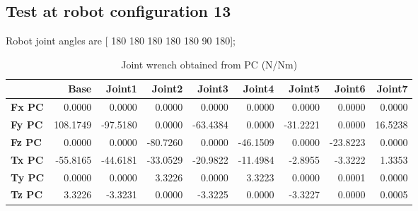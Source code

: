 
\subsection{Test at robot configuration 13}
Robot joint angles are  [ 180  180  180  180  180   90  180];

\begin{table}[h!]
	\centering
	\caption{Joint wrench obtained from PC (N/Nm)}
	\label{wrech_PC_Pose13}
	\begin{tabular}{|l|r|r|r|r|r|r|r|r|}
		\hline
		\textbf{}  & \textbf{Base} & \textbf{Joint1}  & \textbf{Joint2}  & \textbf{Joint3}  & \textbf{Joint4}  & \textbf{Joint5}  & \textbf{Joint6}  & \textbf{Joint7} \\ \hline
		\textbf{Fx PC}  & 0.0000        & 0.0000        & 0.0000        & 0.0000        & 0.0000        & 0.0000        & 0.0000        & 0.0000 \\ \hline
		\textbf{Fy PC}  & 108.1749        & -97.5180        & 0.0000        & -63.4384        & 0.0000        & -31.2221        & 0.0000        & 16.5238 \\ \hline
		\textbf{Fz PC}  & 0.0000        & 0.0000        & -80.7260        & 0.0000        & -46.1509        & 0.0000        & -23.8223        & 0.0000 \\ \hline
		\textbf{Tx PC}  & -55.8165        & -44.6181        & -33.0529        & -20.9822        & -11.4984        & -2.8955        & -3.3222        & 1.3353 \\ \hline
		\textbf{Ty PC}  & 0.0000        & 0.0000        & 3.3226        & 0.0000        & 3.3223        & 0.0000        & 0.0001        & 0.0000 \\ \hline
		\textbf{Tz PC}  & 3.3226        & -3.3231        & 0.0000        & -3.3225        & 0.0000        & -3.3227        & 0.0000        & 0.0005 \\ \hline
	\end{tabular}
\end{table}

